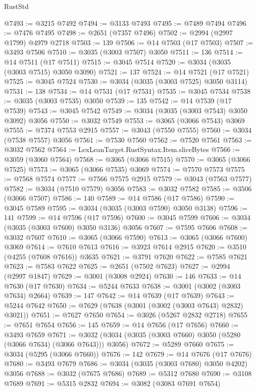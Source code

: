 \begin{lexlean}{RustStd}
\begin{coremodule}
@7493 := @3215 @7492
@7494 := @3133 @7493
@7495 := @7489 @7494
@7496 := @7476 @7495
@7498 := @2651 (@7357 @7496)
@7502 := @2994 (@2997 @1799) @4979 @2718
@7503 := 139
@7506 := @14 @7503 (@17 @7503)
@7507 := @3493 @7506
@7510 := @3035 (@3003 @7507) @3050
@7511 := 136
@7514 := @14 @7511 (@17 @7511)
@7515 := @3045 @7514
@7520 := @3034 (@3035 (@3003 @7515) @3050 @3090)
@7521 := 137
@7524 := @14 @7521 (@17 @7521)
@7525 := @3045 @7524
@7530 := @3034 (@3035 (@3003 @7525) @3050 @3114)
@7531 := 138
@7534 := @14 @7531 (@17 @7531)
@7535 := @3045 @7534
@7538 := @3035 (@3003 @7535) @3050
@7539 := 135
@7542 := @14 @7539 (@17 @7539)
@7543 := @3045 @7542
@7549 := @3034 (@3035 (@3003 @7543) @3050 @3092) @3056
@7550 := @3032 @7549
@7553 := @3065 (@3066 @7543) @3069
@7555 := @7374 @7553 @2915
@7557 := @3043 (@7550 @7555)
@7560 := @3034 (@7538 @7557) @3056
@7561 := @7530 @7560
@7562 := @7520 @7561
@7563 := @3032 @7562
@7564 := LexLeanTarget.RustSyntax.Item.sliceBytes
@7566 := @3059 (@3060 @7564)
@7568 := @3065 (@3066 @7515)
@7570 := @3065 (@3066 @7525)
@7573 := @3065 (@3066 @7535) @3069
@7574 := @7570 @7573
@7575 := @7568 @7574
@7577 := @7566 @7575 @2915
@7579 := @3043 (@7563 @7577)
@7582 := @3034 (@7510 @7579) @3056
@7583 := @3032 @7582
@7585 := @3506 (@3066 @7507)
@7586 := 140
@7589 := @14 @7586 (@17 @7586)
@7590 := @3045 @7589
@7595 := @3034 (@3035 (@3003 @7590) @3050 @3138)
@7596 := 141
@7599 := @14 @7596 (@17 @7596)
@7600 := @3045 @7599
@7606 := @3034 (@3035 (@3003 @7600) @3050 @3136) @3056
@7607 := @7595 @7606
@7608 := @3032 @7607
@7610 := @3065 (@3066 @7590)
@7613 := @3065 (@3066 @7600) @3069
@7614 := @7610 @7613
@7616 := @3923 @7614 @2915
@7620 := @3510 (@4255 (@7608 @7616)) @3635
@7621 := @3791 @7620
@7622 := @7585 @7621
@7623 := @7583 @7622
@7625 := @2651 (@7502 @7623)
@7627 := @2994 (@2997 @1847)
@7629 := @3001 (@3008 @2924)
@7630 := 146
@7633 := @14 @7630 (@17 @7630)
@7634 := @5244 @7633
@7638 := @3001 (@3002 (@3003 @7634) @2664)
@7639 := 147
@7642 := @14 @7639 (@17 @7639)
@7643 := @5244 @7642
@7650 := @7629 (@7638 (@3001 (@3002 (@3003 @7643) @2832) @3021))
@7651 := @7627 @7650
@7654 := @3026 (@5267 @2832 @2718)
@7655 := @7651 @7654
@7656 := 145
@7659 := @14 @7656 (@17 @7656)
@7660 := @3493 @7659
@7671 := @3032 (@3034 (@3035 (@3003 @7660) @3050 (@5280 (@3066 @7634) (@3066 @7643))) @3056)
@7672 := @5289 @7660
@7675 := @3034 (@5295 (@3066 @7660))
@7676 := 142
@7679 := @14 @7676 (@17 @7676)
@7680 := @3493 @7679
@7686 := @3034 (@3035 (@3003 @7680) @3050 @4202) @3056
@7688 := @3032 (@7675 @7686)
@7689 := @5312 @7680
@7690 := @3108 @7689
@7691 := @5315 @2832
@7694 := @3082 (@3083 @7691 @7654)

\end{coremodule}
\end{lexlean}
